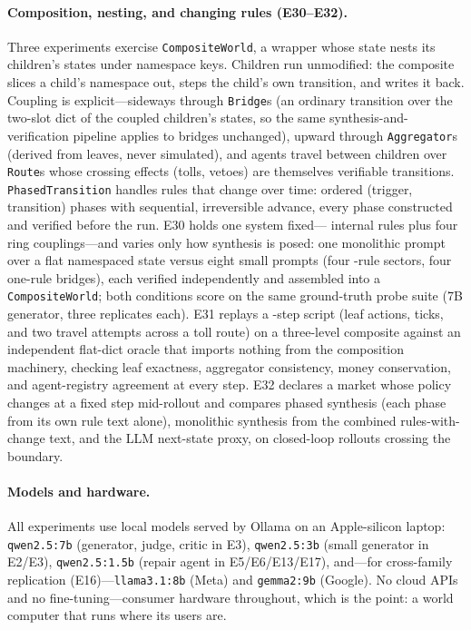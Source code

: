 \documentclass[11pt]{article}
\begin{document}
\paragraph{Composition, nesting, and changing rules (E30--E32).} Three
experiments exercise \texttt{CompositeWorld}, a wrapper whose state nests its
children's states under namespace keys. Children run unmodified: the
composite slices a child's namespace out, steps the child's own transition,
and writes it back. Coupling is explicit---sideways through \texttt{Bridge}s
(an ordinary transition over the two-slot dict of the coupled children's
states, so the same synthesis-and-verification pipeline applies to bridges
unchanged), upward through \texttt{Aggregator}s (derived from leaves, never
simulated), and agents travel between children over \texttt{Route}s whose
crossing effects (tolls, vetoes) are themselves verifiable transitions.
\texttt{PhasedTransition} handles rules that change over time: ordered
(trigger, transition) phases with sequential, irreversible advance, every
phase constructed and verified before the run. E30 holds one system
fixed---\CompRules{} internal rules plus four ring couplings---and varies
only how synthesis is posed: one monolithic prompt over a flat namespaced
state versus eight small prompts (four \CompChildRules-rule sectors, four
one-rule bridges), each verified independently and assembled into a
\texttt{CompositeWorld}; both conditions score on the same ground-truth probe
suite (7B generator, three replicates each). E31 replays a \NestSteps-step
script (leaf actions, ticks, and two travel attempts across a toll route) on
a three-level composite against an independent flat-dict oracle that imports
nothing from the composition machinery, checking leaf exactness, aggregator
consistency, money conservation, and agent-registry agreement at every step.
E32 declares a market whose policy changes at a fixed step mid-rollout and
compares phased synthesis (each phase from its own rule text alone),
monolithic synthesis from the combined rules-with-change text, and the LLM
next-state proxy, on closed-loop rollouts crossing the boundary.

\paragraph{Models and hardware.} All experiments use local models served by
Ollama on an Apple-silicon laptop: \texttt{qwen2.5:7b} (generator, judge,
critic in E3), \texttt{qwen2.5:3b} (small generator in E2/E3),
\texttt{qwen2.5:1.5b} (repair agent in E5/E6/E13/E17), and---for
cross-family replication (E16)---\texttt{llama3.1:8b} (Meta) and
\texttt{gemma2:9b} (Google). No cloud APIs and no fine-tuning---consumer
hardware throughout, which is the point: a world computer that runs where its
users are.
\end{document}
